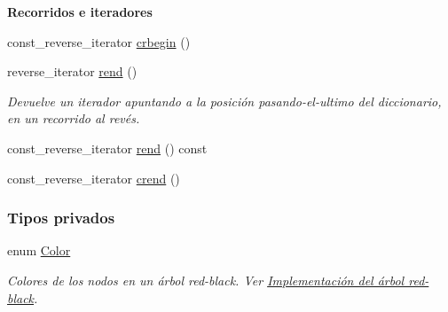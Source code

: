 \begin{Indent}{\bf \-Recorridos e iteradores}
\begin{DoxyCompactItemize}
\item 
const\-\_\-reverse\-\_\-iterator \hyperlink{classaed2_1_1iterator_aa4b6ce667258581859351db42cfd3ee4_aa4b6ce667258581859351db42cfd3ee4}{crbegin} ()
\item 
reverse\-\_\-iterator \hyperlink{classaed2_1_1iterator_a0007a7962bc6aca8dca78c2a49bd581d_a0007a7962bc6aca8dca78c2a49bd581d}{rend} ()
\begin{DoxyCompactList}\small\item\em \-Devuelve un iterador apuntando a la posición pasando-\/el-\/ultimo del diccionario, en un recorrido al revés. \end{DoxyCompactList}\item 
const\-\_\-reverse\-\_\-iterator \hyperlink{classaed2_1_1iterator_a1230bf2063ce100c830129a24dea854d_a1230bf2063ce100c830129a24dea854d}{rend} () const 
\item 
const\-\_\-reverse\-\_\-iterator \hyperlink{classaed2_1_1iterator_a2e31ad7ded06c666c6c37c5d30bb41af_a2e31ad7ded06c666c6c37c5d30bb41af}{crend} ()
\end{DoxyCompactItemize}
\end{Indent}
\subsubsection*{\-Tipos privados}
\begin{DoxyCompactItemize}
\item 
enum \hyperlink{classaed2_1_1iterator_aaa188f82ba585d8de525b1400242cf4f_aaa188f82ba585d8de525b1400242cf4f}{\-Color} 
\begin{DoxyCompactList}\small\item\em \-Colores de los nodos en un árbol red-\/black. \-Ver \hyperlink{Implementacion}{\-Implementación del árbol red-\/black}. \end{DoxyCompactList}\end{DoxyCompactItemize}
